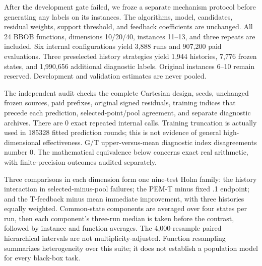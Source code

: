 \documentclass[11pt,a4paper]{article}
\begin{document}
After the development gate failed, we froze a separate mechanism
protocol before generating any labels on its instances. The algorithms,
model, candidates, residual weights, support threshold, and feedback
coefficients are unchanged. All 24 BBOB functions, dimensions 10/20/40,
instances 11--13, and three repeats are included. Six internal
configurations yield 3,888 runs and 907,200 paid evaluations. Three
preselected history strategies yield 1,944 histories, 7,776 frozen
states, and 1,990,656 additional diagnostic labels. Original instances
6--10 remain reserved. Development and validation estimates are never
pooled.

The independent audit checks the complete Cartesian design, seeds,
unchanged frozen sources, paid prefixes, original signed residuals,
training indices that precede each prediction, selected-point/pool
agreement, and separate diagnostic archives. There are 0 exact repeated
internal calls. Training truncation is actually used in 185328 fitted
prediction rounds; this is not evidence of general high-dimensional
effectiveness. G/T upper-versus-mean diagnostic index disagreements
number 0. The mathematical equivalence below concerns exact real
arithmetic, with finite-precision outcomes audited separately.

Three comparisons in each dimension form one nine-test Holm family: the
history interaction in selected-minus-pool failures; the PEM-T minus
fixed .1 endpoint; and the T-feedback minus mean immediate improvement,
with three histories equally weighted. Common-state components are
averaged over four states per run, then each component's three-run
median is taken before the contrast, followed by instance and function
averages. The 4,000-resample paired hierarchical intervals are not
multiplicity-adjusted. Function resampling summarizes heterogeneity over
this suite; it does not establish a population model for every black-box
task.
\end{document}
